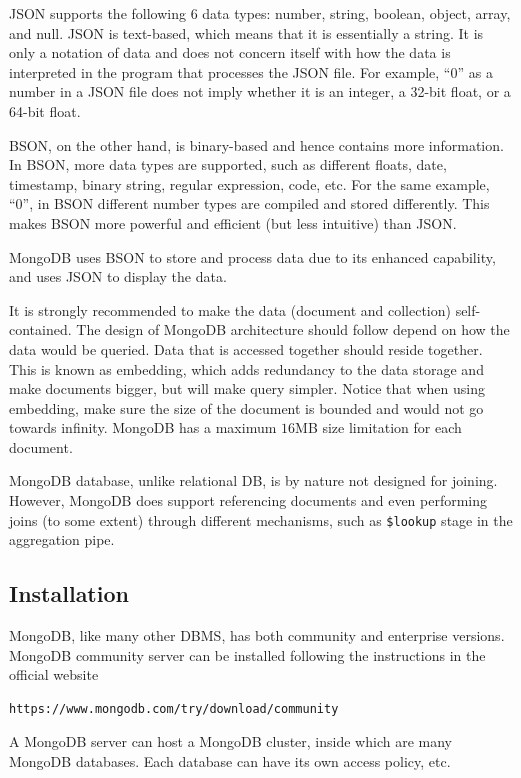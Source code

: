 \begin{shortbox}
	
	JSON supports the following 6 data types: number, string, boolean, object, array, and null. JSON is text-based, which means that it is essentially a string. It is only a notation of data and does not concern itself with how the data is interpreted in the program that processes the JSON file. For example, ``0'' as a number in a JSON file does not imply whether it is an integer, a 32-bit float, or a 64-bit float.
	
	BSON, on the other hand, is binary-based and hence contains more information. In BSON, more data types are supported, such as different floats, date, timestamp, binary string, regular expression, code, etc. For the same example, ``0'', in BSON different number types are compiled and stored differently. This makes BSON more powerful and efficient (but less intuitive) than JSON.
	
\end{shortbox}

MongoDB uses BSON to store and process data due to its enhanced capability, and uses JSON to display the data.

It is strongly recommended to make the data (document and collection) self-contained. The design of MongoDB architecture should follow depend on how the data would be queried. Data that is accessed together should reside together. This is known as embedding, which adds redundancy to the data storage and make documents bigger, but will make query simpler. Notice that when using embedding, make sure the size of the document is bounded and would not go towards infinity. MongoDB has a maximum $16$MB size limitation for each document.

MongoDB database, unlike relational DB, is by nature not designed for joining. However, MongoDB does support referencing documents and even performing joins (to some extent) through different mechanisms, such as \verb|$lookup| stage in the aggregation pipe.

\subsection{Installation}

MongoDB, like many other DBMS, has both community and enterprise versions. MongoDB community server can be installed following the instructions in the official website
\begin{lstlisting}
https://www.mongodb.com/try/download/community
\end{lstlisting}
A MongoDB server can host a MongoDB cluster, inside which are many MongoDB databases. Each database can have its own access policy, etc.


